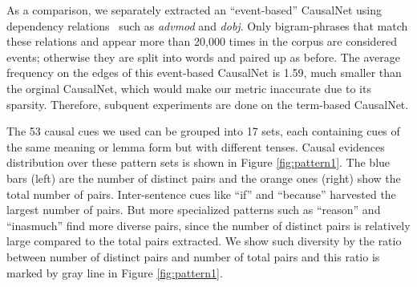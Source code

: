 \documentclass[letterpaper]{article}
\newcommand{\figref}[1]{Figure \ref{#1}}
\begin{document}
As a comparison, we separately extracted an
``event-based'' CausalNet using dependency relations~\cite{chen2014fast}
such as \emph{advmod} and \emph{dobj}.
Only bigram-phrases that match these relations and appear more than
20,000 times in the corpus are considered events; otherwise they are split
into words and paired up as before.
The average frequency on the edges of this event-based CausalNet
is 1.59, much smaller than the orginal CausalNet,
which would make our metric inaccurate due to its sparsity.
Therefore, subquent
experiments are done on the term-based CausalNet.

The 53 causal cues we used can be grouped into 17 sets, each
containing cues of the same meaning or lemma form but with different
tenses. Causal evidences distribution over these pattern sets
is shown in Figure \ref{fig:pattern1}.
The blue bars (left) are the number of distinct
pairs and the orange ones (right) show the total number of pairs.
Inter-sentence cues like ``if'' and ``because'' harvested the
largest number of pairs. But more specialized patterns such as
``reason'' and ``inasmuch'' find more diverse pairs, since the
number of distinct pairs is relatively large compared to the total
pairs extracted.
We show such diversity by the ratio between number of distinct pairs
and number of total pairs
and this ratio is marked by gray line in \figref{fig:pattern1}.
\end{document}
